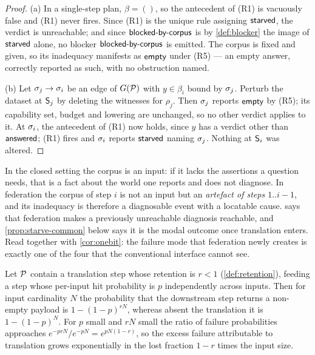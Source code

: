 \begin{proof}
(a) In a single-step plan, $\beta = ()$, so the antecedent of (R1) is vacuously
false and (R1) never fires. Since (R1) is the unique rule assigning $\textsf{starved}$,
the verdict is unreachable; and since $\textsf{blocked-by-corpus}$ is by \cref{def:blocker} the
image of $\textsf{starved}$ alone, no blocker $\textsf{blocked-by-corpus}$ is emitted. The corpus is fixed
and given, so its inadequacy manifests as $\textsf{empty}$ under (R5) --- an empty
answer, correctly reported as such, with no obstruction named.

(b) Let $\sigma_j \to \sigma_i$ be an edge of $G(\mathcal{P})$ with $y \in \beta_i$
bound by $\sigma_j$. Perturb the dataset at $\mathsf{S}_j$ by deleting the witnesses
for $\rho_j$. Then $\sigma_j$ reports $\textsf{empty}$ by (R5); its capability set,
budget and lowering are unchanged, so no other verdict applies to it. At
$\sigma_i$, the antecedent of (R1) now holds, since $y$ has a verdict other than
$\textsf{answered}$; (R1) fires and $\sigma_i$ reports $\textsf{starved}$ naming $\sigma_j$. Nothing
at $\mathsf{S}_i$ was altered.
\end{proof}

\begin{remark}
\label{rem:starve-characteristic}
In the closed setting the corpus is an input: if it lacks the assertions a
question needs, that is a fact about the world one reports and does not
diagnose. In federation the corpus of step $i$ is not an input but an
\emph{artefact of steps $1..i-1$}, and its inadequacy is therefore a
diagnosable event with a locatable cause.  says
that federation makes a previously unreachable diagnosis reachable, and
\cref{prop:starve-common} below says it is the modal outcome once translation
enters. Read together with \cref{cor:onebit}: the failure mode that federation
newly creates is exactly one of the four that the conventional interface cannot
see.
\end{remark}

\begin{proposition}
\label{prop:starve-common}
Let $\mathcal{P}$ contain a translation step whose retention is $r < 1$
(\cref{def:retention}), feeding a step whose per-input hit probability is $p$
independently across inputs. Then for input cardinality $N$ the probability
that the downstream step returns a non-empty payload is
$1 - (1-p)^{rN}$, whereas absent the translation it is $1-(1-p)^{N}$. For $p$
small and $rN$ small the ratio of failure probabilities approaches
$e^{-prN}/e^{-pN} = e^{p N (1-r)}$, so the excess failure attributable to
translation grows exponentially in the lost fraction $1-r$ times the input
size.
\end{proposition}


